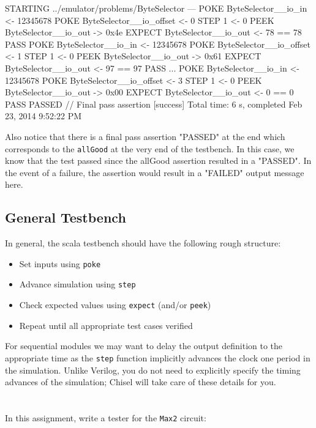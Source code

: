 \begin{bash}
STARTING ../emulator/problems/ByteSelector
---
POKE ByteSelector__io_in <- 12345678
POKE ByteSelector__io_offset <- 0
STEP 1 <- 0
PEEK ByteSelector__io_out -> 0x4e
EXPECT ByteSelector__io_out <- 78 == 78 PASS
POKE ByteSelector__io_in <- 12345678
POKE ByteSelector__io_offset <- 1
STEP 1 <- 0
PEEK ByteSelector__io_out -> 0x61
EXPECT ByteSelector__io_out <- 97 == 97 PASS
...
POKE ByteSelector__io_in <- 12345678
POKE ByteSelector__io_offset <- 3
STEP 1 <- 0
PEEK ByteSelector__io_out -> 0x00
EXPECT ByteSelector__io_out <- 0 == 0 PASS
PASSED   // Final pass assertion
[success] Total time: 6 s, completed Feb 23, 2014 9:52:22 PM
\end{bash}

Also notice that there is a final pass assertion "PASSED" at the end which corresponds to the \verb+allGood+ at the very end of the testbench. In this case, we know that the test passed since the allGood assertion resulted in a "PASSED". In the event of a failure, the assertion would result in a "FAILED" output message here.

\subsection{General Testbench}

In general, the scala testbench should have the following rough structure:

\begin{itemize}
\item Set inputs using \verb+poke+
\item Advance simulation using \verb+step+
\item Check expected values using \verb+expect+ (and/or \verb+peek+)
\item Repeat until all appropriate test cases verified
\end{itemize}

For sequential modules we may want to delay the output definition to the appropriate time as the \verb+step+ function implicitly advances the clock one period in the simulation. Unlike Verilog, you do not need to explicitly specify the timing advances of the simulation; Chisel will take care of these details for you.

\section{}

In this assignment, write a tester for the \verb+Max2+ circuit:

